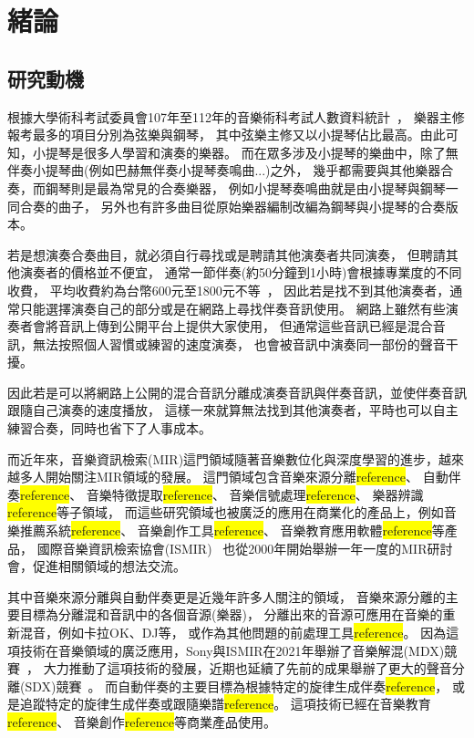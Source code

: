 \documentclass[class=NCU_thesis, crop=false]{standalone}
\begin{document}
\chapter{緒論}
\section{研究動機}

根據大學術科考試委員會107年至112年的音樂術科考試人數資料統計~\cite{CAPE2024Statistics}，
樂器主修報考最多的項目分別為弦樂與鋼琴，
其中弦樂主修又以小提琴佔比最高。由此可知，小提琴是很多人學習和演奏的樂器。
而在眾多涉及小提琴的樂曲中，除了無伴奏小提琴曲(例如巴赫無伴奏小提琴奏鳴曲...)之外，
幾乎都需要與其他樂器合奏，而鋼琴則是最為常見的合奏樂器，
例如小提琴奏鳴曲就是由小提琴與鋼琴一同合奏的曲子，
另外也有許多曲目從原始樂器編制改編為鋼琴與小提琴的合奏版本。

若是想演奏合奏曲目，就必須自行尋找或是聘請其他演奏者共同演奏，
但聘請其他演奏者的價格並不便宜，
通常一節伴奏(約50分鐘到1小時)會根據專業度的不同收費，
平均收費約為台幣600元至1800元不等~\cite{2020PianoAccompanistHourlySalary}，
因此若是找不到其他演奏者，通常只能選擇演奏自己的部分或是在網路上尋找伴奏音訊使用。
網路上雖然有些演奏者會將音訊上傳到公開平台上提供大家使用，
但通常這些音訊已經是混合音訊，無法按照個人習慣或練習的速度演奏，
也會被音訊中演奏同一部份的聲音干擾。

因此若是可以將網路上公開的混合音訊分離成演奏音訊與伴奏音訊，並使伴奏音訊跟隨自己演奏的速度播放，
這樣一來就算無法找到其他演奏者，平時也可以自主練習合奏，同時也省下了人事成本。

而近年來，音樂資訊檢索(MIR)這門領域隨著音樂數位化與深度學習的進步，越來越多人開始關注MIR領域的發展。
這門領域包含音樂來源分離{\colorbox{yellow}{reference}}、
自動伴奏{\colorbox{yellow}{reference}}、
音樂特徵提取{\colorbox{yellow}{reference}}、
音樂信號處理{\colorbox{yellow}{reference}}、
樂器辨識{\colorbox{yellow}{reference}}等子領域，
而這些研究領域也被廣泛的應用在商業化的產品上，例如音樂推薦系統{\colorbox{yellow}{reference}}、
音樂創作工具{\colorbox{yellow}{reference}}、
音樂教育應用軟體{\colorbox{yellow}{reference}}等產品，
國際音樂資訊檢索協會(ISMIR)~\cite{ISMIR2024InternationalSociety}
也從2000年開始舉辦一年一度的MIR研討會，促進相關領域的想法交流。

其中音樂來源分離與自動伴奏更是近幾年許多人關注的領域，
音樂來源分離的主要目標為分離混和音訊中的各個音源(樂器)，
分離出來的音源可應用在音樂的重新混音，例如卡拉OK、DJ等，
或作為其他問題的前處理工具{\colorbox{yellow}{reference}}。
因為這項技術在音樂領域的廣泛應用，Sony與ISMIR在2021年舉辦了音樂解混(MDX)競賽~\cite{Yuki_Mitsufuji2021MusicDemixing}，
大力推動了這項技術的發展，近期也延續了先前的成果舉辦了更大的聲音分離(SDX)競賽~\cite{Fabbro_Giorgio2023TheSoundDemixing}。
而自動伴奏的主要目標為根據特定的旋律生成伴奏{\colorbox{yellow}{reference}}，
或是追蹤特定的旋律生成伴奏或跟隨樂譜{\colorbox{yellow}{reference}}。
這項技術已經在音樂教育{\colorbox{yellow}{reference}}、
音樂創作{\colorbox{yellow}{reference}}等商業產品使用。
\end{document}
